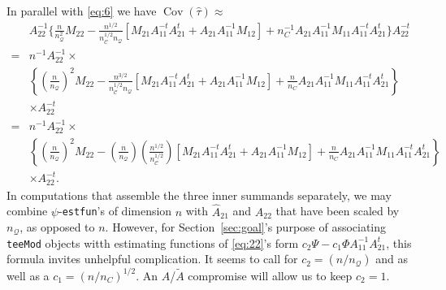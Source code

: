 \documentclass{article}
\begin{document}
  In parallel with \eqref{eq:6} we
  have $\operatorname{Cov}(\hat\tau) \approx$
  \begin{align*}
  &A_{22}^{-1}\{\frac{n}{n_{\mathcal{Q}}^{2}} M_{22} -
                                 \frac{n^{1/2}}{n_{\mathcal{C}}^{1/2}n_{\mathcal{Q}}}[M_{21}A_{11}^{-t}A_{21}^t
                                 + A_{21}A_{11}^{-1}M_{12}] +
                                 n_C^{-1}A_{21}A_{11}^{-1}M_{11}A_{11}^{-t}A_{21}^{t}\}A_{22}^{-t}\nonumber
  \\
                               =& n^{-1}A_{22}^{-1} \times\\
                                 &\left\{\left(\frac{n}{n_{\mathcal{Q}}}\right)^{2}M_{22} -
                                 \frac{n^{3/2}}{n_{\mathcal{C}}^{1/2}n_{\mathcal{Q}}}[M_{21}A_{11}^{-t}A_{21}^t
                                 + A_{21}A_{11}^{-1}M_{12}] +
                                 \frac{n}{n_C}A_{21}A_{11}^{-1}M_{11}A_{11}^{-t}A_{21}^{t}\right\}\\
    &
                                 \times A_{22}^{-t}\\
                               =& n^{-1}A_{22}^{-1} \times\\
                                 &\left\{\left(\frac{n}{n_{\mathcal{Q}}}\right)^{2}M_{22} -
                                 \left(\frac{n}{n_{\mathcal{Q}}}\right)\left(\frac{n^{1/2}}{n_{\mathcal{C}}^{1/2}}\right)[M_{21}A_{11}^{-t}A_{21}^t
                                 + A_{21}A_{11}^{-1}M_{12}] +
                                 \frac{n}{n_C}A_{21}A_{11}^{-1}M_{11}A_{11}^{-t}A_{21}^{t}\right\}\\
    &
                                 \times A_{22}^{-t}
                                .
\end{align*}
In computations that assemble the three inner summands separately, we may combine $\psi$-\texttt{estfun}'s of dimension
$n$ with $\hat{A}_{21}$ and $\hat{A}_{22}$ that have been scaled by
$n_{\mathcal{Q}}$, as opposed to $n$.  However, for Section~\ref{sec:goal}'s purpose of
associating \texttt{teeMod} objects witth estimating functions of \eqref{eq:22}'s form $c_{2}\Psi - c_{1}\Phi
A_{11}^{-1}A_{21}^{t}$, this formula invites unhelpful
complication. It seems to call for $c_{2}=({n}/{n_{\mathcal{Q}}})$
and as well as a $c_{1}=({n}/{n_C})^{1/2}$.  An $A$/$\tilde{A}$
compromise will allow us to keep $c_{2}=1$.
\end{document}
